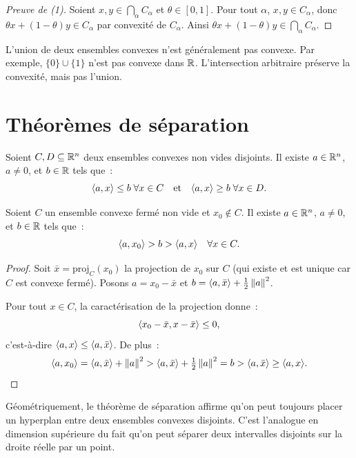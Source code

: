 \begin{proof}[Preuve de (1)]
Soient $x, y \in \bigcap_\alpha C_\alpha$ et $\theta \in [0,1]$. Pour tout $\alpha$,
$x, y \in C_\alpha$, donc $\theta x + (1-\theta)y \in C_\alpha$ par convexit\'e de
$C_\alpha$. Ainsi $\theta x + (1-\theta)y \in \bigcap_\alpha C_\alpha$.
\end{proof}

\begin{remarque}
L'union de deux ensembles convexes n'est g\'en\'eralement pas convexe.
Par exemple, $\{0\} \cup \{1\}$ n'est pas convexe dans $\mathbb{R}$.
L'intersection arbitraire pr\'eserve la convexit\'e, mais pas l'union.
\end{remarque}

\section{Th\'eor\`emes de s\'eparation}

\begin{theoreme}
\label{thm:separation}
Soient $C, D \subseteq \mathbb{R}^n$ deux ensembles convexes non vides disjoints.
Il existe $a \in \mathbb{R}^n$, $a \neq 0$, et $b \in \mathbb{R}$ tels que~:
\[
    \langle a, x \rangle \leq b \; \forall x \in C
    \quad \text{et} \quad
    \langle a, x \rangle \geq b \; \forall x \in D.
\]
\end{theoreme}

\begin{theoreme}
\label{thm:separation_stricte}
Soient $C$ un ensemble convexe ferm\'e non vide et $x_0 \notin C$.
Il existe $a \in \mathbb{R}^n$, $a \neq 0$, et $b \in \mathbb{R}$ tels que~:
\[
    \langle a, x_0 \rangle > b > \langle a, x \rangle \quad \forall x \in C.
\]
\end{theoreme}

\begin{proof}
Soit $\bar{x} = \mathrm{proj}_C(x_0)$ la projection de $x_0$ sur $C$ (qui existe
et est unique car $C$ est convexe ferm\'e). Posons $a = x_0 - \bar{x}$ et
$b = \langle a, \bar{x} \rangle + \frac{1}{2}\left\| a \right\|^2$.

Pour tout $x \in C$, la caract\'erisation de la projection donne~:
\[
    \langle x_0 - \bar{x}, x - \bar{x} \rangle \leq 0,
\]
c'est-\`a-dire $\langle a, x \rangle \leq \langle a, \bar{x} \rangle$. De plus~:
\[
    \langle a, x_0 \rangle = \langle a, \bar{x} \rangle + \left\| a \right\|^2 > \langle a, \bar{x} \rangle + \tfrac{1}{2}\left\| a \right\|^2 = b > \langle a, \bar{x} \rangle \geq \langle a, x \rangle.
\]
\end{proof}

\begin{intuition}
G\'eom\'etriquement, le th\'eor\`eme de s\'eparation affirme qu'on peut toujours
placer un hyperplan entre deux ensembles convexes disjoints. C'est l'analogue en
dimension sup\'erieure du fait qu'on peut s\'eparer deux intervalles disjoints sur
la droite r\'eelle par un point.
\end{intuition}

